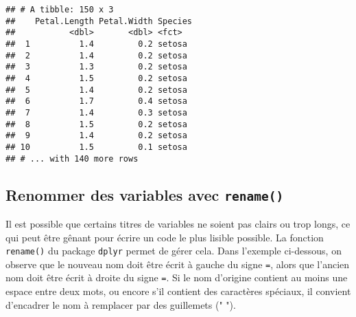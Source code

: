 \documentclass[
  french,
]{book}
\newenvironment{Shaded}{\begin{snugshade}}{\end{snugshade}}
\newcommand{\DataTypeTok}[1]{\textcolor[rgb]{0.13,0.29,0.53}{#1}}
\newcommand{\KeywordTok}[1]{\textcolor[rgb]{0.13,0.29,0.53}{\textbf{#1}}}
\newcommand{\NormalTok}[1]{#1}
\newcommand{\OperatorTok}[1]{\textcolor[rgb]{0.81,0.36,0.00}{\textbf{#1}}}
\newcommand{\StringTok}[1]{\textcolor[rgb]{0.31,0.60,0.02}{#1}}
\begin{document}
\begin{Shaded}
\end{Shaded}

\begin{verbatim}
## # A tibble: 150 x 3
##    Petal.Length Petal.Width Species
##           <dbl>       <dbl> <fct>  
##  1          1.4         0.2 setosa 
##  2          1.4         0.2 setosa 
##  3          1.3         0.2 setosa 
##  4          1.5         0.2 setosa 
##  5          1.4         0.2 setosa 
##  6          1.7         0.4 setosa 
##  7          1.4         0.3 setosa 
##  8          1.5         0.2 setosa 
##  9          1.4         0.2 setosa 
## 10          1.5         0.1 setosa 
## # ... with 140 more rows
\end{verbatim}

\hypertarget{renommer-des-variables-avec-rename}{%
\subsection{\texorpdfstring{Renommer des variables avec \texttt{rename()}}{Renommer des variables avec rename()}}\label{renommer-des-variables-avec-rename}}

Il est possible que certains titres de variables ne soient pas clairs ou trop longs, ce qui peut être gênant pour écrire un code le plus lisible possible. La fonction \texttt{rename()} du package \texttt{dplyr} permet de gérer cela. Dans l'exemple ci-dessous, on observe que le nouveau nom doit être écrit à gauche du signe \texttt{=}, alors que l'ancien nom doit être écrit à droite du signe \texttt{=}. Si le nom d'origine contient au moins une espace entre deux mots, ou encore s'il contient des caractères spéciaux, il convient d'encadrer le nom à remplacer par des guillemets (" ").

\begin{Shaded}
\end{Shaded}
\end{document}
